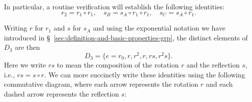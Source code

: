 \begin{example}
\begin{center}
    \end{center}
    In particular, a routine verification will establish the following
    identities:
    \[
        r_2 = r_1 \circ r_1, \quad s_B = s_A \circ r_1 \circ r_1, \quad s_C = s_A \circ r_1.
    \]

    Writing \(r\) for \(r_1\) and \(s\) for \(s_A\) and using the exponential
    notation we have introduced in
    \S~\ref{sec:definition-and-basic-properties-grp}, the distinct elements of
    \(D_3\) are then
    \[
        D_3 = \{e = r_0, r, r^2, r, rs, r^2s\}.
    \]
    Here we write \(rs\) to mean the composition of the rotation \(r\) and the
    reflection \(s\), i.e., \(rs = s\circ r\). We can more succinctly write
    these identities using the following commutative diagram, where each arrow
    represents the rotation \(r\) and each dashed arrow represents the
    reflection \(s\):
    \begin{center}
\end{center}
\end{example}
